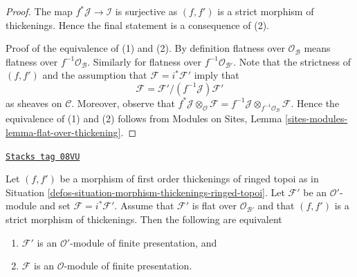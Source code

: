 \begin{proof}
The map $f^*\mathcal{J} \to \mathcal{I}$ is surjective
as $(f, f')$ is a strict morphism of thickenings.
Hence the final statement is a consequence of (2).

\medskip\noindent
Proof of the equivalence of (1) and (2). By definition flatness over
$\mathcal{O}_\mathcal{B}$ means flatness over $f^{-1}\mathcal{O}_\mathcal{B}$.
Similarly for flatness over $f^{-1}\mathcal{O}_{\mathcal{B}'}$.
Note that the strictness of $(f, f')$ and the assumption that
$\mathcal{F} = i^*\mathcal{F}'$ imply that
$$
\mathcal{F} = \mathcal{F}'/(f^{-1}\mathcal{J})\mathcal{F}'
$$
as sheaves on $\mathcal{C}$. Moreover, observe that
$f^*\mathcal{J} \otimes_\mathcal{O} \mathcal{F} =
f^{-1}\mathcal{J} \otimes_{f^{-1}\mathcal{O}_\mathcal{B}} \mathcal{F}$.
Hence the equivalence of (1) and (2) follows from
Modules on Sites, Lemma \ref{sites-modules-lemma-flat-over-thickening}.
\end{proof}

\begin{lemma}
\label{defos-lemma-deform-fp-module-ringed-topoi}
\href{https://stacks.math.columbia.edu/tag/08VU}{\texttt{Stacks tag 08VU}}

Let $(f, f')$ be a morphism of first order thickenings of ringed topoi
as in Situation \ref{defos-situation-morphism-thickenings-ringed-topoi}.
Let $\mathcal{F}'$ be an $\mathcal{O}'$-module
and set $\mathcal{F} = i^*\mathcal{F}'$.
Assume that $\mathcal{F}'$ is flat over $\mathcal{O}_{\mathcal{B}'}$
and that $(f, f')$ is a strict morphism of thickenings.
Then the following are equivalent
\begin{enumerate}
\item $\mathcal{F}'$ is an $\mathcal{O}'$-module of finite presentation, and
\item $\mathcal{F}$ is an $\mathcal{O}$-module of finite presentation.
\end{enumerate}
\end{lemma}

